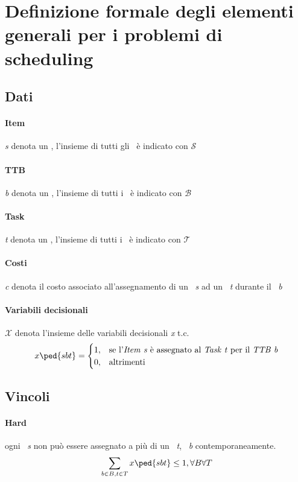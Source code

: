 \section{Definizione formale degli elementi generali per i problemi di scheduling}
    \subsection{Dati}
        \paragraph{Item} \textit{s} denota un \items, l'insieme di tutti gli \items\ è indicato con $\mathcal{S}$
        \paragraph{TTB} \textit{b} denota un \ttb, l'insieme di tutti i \ttb\ è indicato con $\mathcal{B}$
        \paragraph{Task} \textit{t} denota un \task, l'insieme di tutti i \task\ è indicato con $\mathcal{T}$
        \paragraph{Costi} \textit{c} denota il costo associato all'assegnamento di un \items\ \textit{s} ad un \task\ \textit{t} durante il \ttb\ \textit{b}
        \paragraph{Variabili decisionali} $\mathcal{X}$ denota l'insieme delle variabili decisionali \textit{x} t.c.
        \[
        x\ped{sbt} = \begin{cases}
            1,& \text{se l'\items\ \textit{s} è assegnato al \task\ \textit{t} per il \ttb\ \textit{b}}  \\
            0,& \text{altrimenti}
        \end{cases}
        \]
    \subsection{Vincoli}
        \paragraph{Hard} ogni \items\ \textit{s} non può essere assegnato a più di un \task\ \textit{t}, \ttb\ \textit{b} contemporaneamente. \[\sum_{b\in B, t\in T} x\ped{sbt} \le 1, \forall B \forall T \]
